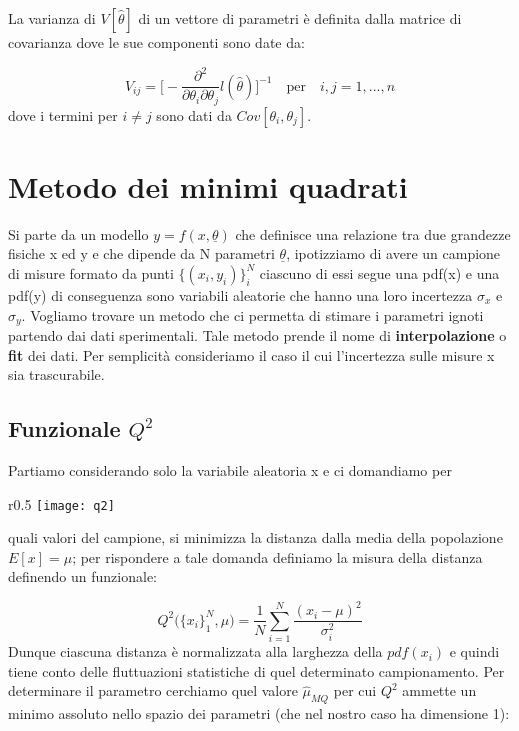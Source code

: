 \documentclass[11pt,a4paper]{book}
\begin{document}
La varianza di $V[\hat{\theta}]$ di un vettore di parametri \`{e} definita dalla matrice di covarianza dove le sue componenti sono date da:

\begin{equation}
	V_{ij} = \Big[ - \dfrac{\partial^2}{\partial \theta_i \partial \theta_j}l(\hat{\theta}) \Big]^{-1} \quad \text{per} \quad i,j = 1,...,n
\end{equation}
dove i termini per $i \neq j$ sono dati da $Cov[\theta_i,\theta_j]$.


\section{Metodo dei minimi quadrati}
Si parte da un modello $y = f(x,\underline{\theta})$ che definisce una relazione tra due grandezze fisiche x ed y e che dipende da N parametri $\underline{\theta}$, ipotizziamo di avere un campione di misure formato da punti $\{(x_i,y_i)\}_{i}^N$ ciascuno di essi segue una pdf(x) e una pdf(y) di conseguenza sono variabili aleatorie che hanno una loro incertezza $\sigma_x$ e $\sigma_y$. Vogliamo trovare un metodo che ci permetta di stimare i parametri ignoti partendo dai dati sperimentali. Tale metodo prende il nome di \textbf{interpolazione} o \textbf{fit} dei dati. Per semplicit\`{a} consideriamo il caso il cui l'incertezza sulle misure x sia trascurabile.

\subsection{Funzionale $Q^2$}

\noindent Partiamo considerando solo la variabile aleatoria x  e ci domandiamo per 
\begin{wrapfigure}{r}{0.5 \textwidth}
\vspace{-10pt}
\centering
\texttt{[image: q2]}	
\end{wrapfigure}
quali valori del campione, si minimizza la distanza dalla media della popolazione $E[x] = \mu$; per rispondere a tale domanda definiamo la misura della distanza definendo un funzionale:
\newline

\begin{equation}
	Q^2\Big(\{x_i\}_1^N,\mu \Big) = \dfrac{1}{N}\sum_{i=1}^N\dfrac{(x_i - \mu)^2}{\sigma_i^2}
\end{equation}
\newline
Dunque ciascuna distanza \`{e} normalizzata alla larghezza della $pdf(x_i)$ e quindi tiene conto delle fluttuazioni statistiche di quel determinato campionamento.\newline
 Per determinare il  parametro cerchiamo quel valore $\hat{\mu}_{MQ}$ per cui $Q^2$ ammette un minimo assoluto nello spazio dei parametri (che nel nostro caso ha dimensione 1):
\end{document}
